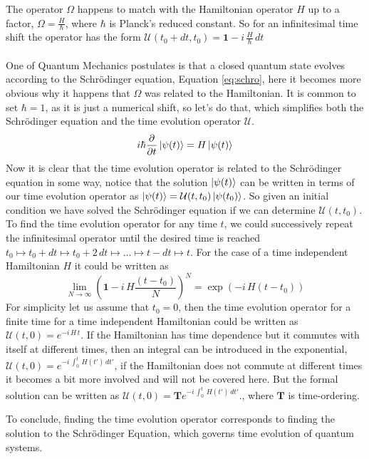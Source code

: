 The operator $\Omega$ happens  to match with the Hamiltonian operator $H$ up to a factor, $\Omega = \frac{H}{\hbar}$, where $\hbar$ is Planck's reduced constant. So for an infinitesimal time shift the operator has the form $\mathcal{U}(t_0 + dt, t_0) = \mathbf{1} - i\,\frac{H}{\hbar} \,dt$
\\
\\
One of Quantum Mechanics postulates is that a closed quantum state evolves according to the Schrödinger equation, Equation \ref{eq:schro}, here it becomes more obvious why it happens that $\Omega$ was related to the Hamiltonian. It is common to set $\hbar = 1$, as it is just a numerical shift, so let's do that, which simplifies both the Schrödinger equation and the time evolution operator $\mathcal{U}$. 
\begin{equation} 
i \hbar \pdv{}{t} \ket{\psi(t)} = H \ket{\psi(t)}
\label{eq:schro}
\end{equation} 
Now it is clear that the time evolution operator is related to the Schrödinger equation in some way, notice that the solution $\ket{\psi(t)}$ can be written in terms of our time evolution operator as
$\ket{\psi(t)} = \mathcal{U}(t,t_0)\ket{\psi(t_0)}$. So given an initial condition we have solved the Schrödinger equation if we can determine $\mathcal{U}(t,t_0)$.  
To find the time evolution operator for any time $t$, we could successively repeat the infinitesimal operator until the desired time is reached $t_0 \mapsto t_0 + dt \mapsto t_0 + 2\,dt \mapsto \dots \mapsto t - dt \mapsto t$. For the case of a time independent Hamiltonian $H$ it could be written as
\begin{equation}
\lim_{N \rightarrow \infty} \left(\mathbf{1} - i\,H\frac{(t-t_0)}{N} \right)^N = \exp\left(- i\,H(t-t_0) \right)
\end{equation}
For simplicity let us assume that $t_0 = 0$, then the time evolution operator for a finite time for a time independent Hamiltonian could be written as $\mathcal{U}(t,0) = e^{-i\,H\,t}$. If the Hamiltonian has time dependence but it commutes with itself at different times, then an integral can be introduced in the exponential, $\mathcal{U}(t,0) = e^{-i\,\int_0^t \,H(t')\, dt'}$, if the Hamiltonian does not commute at different times it becomes a bit more involved and will not be covered here. But the formal solution can be written as $\mathcal{U}(t,0) = \mathbf{T}e^{-i\,\int_0^t \,H(t')\, dt'}$.,  where $\mathbf{T}$ is time-ordering.

To conclude, finding the time evolution operator corresponds to finding the solution to the Schrödinger Equation, which governs time evolution of quantum systems.








